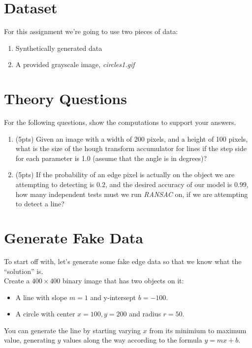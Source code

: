 \documentclass[12pt]{article}
\begin{document}
\newpage
\section*{Dataset}
For this assignment we're going to use two pieces of data:
\begin{enumerate}
\item Synthetically generated data
\item A provided grayscale image,  \emph{circles1.gif}
\end{enumerate}

\newpage
\section{Theory Questions}
\noindent
For the following questions, show the computations to support your answers.
\begin{enumerate}
\item (5pts) Given an image with a width of 200 pixels, and a height of 100 pixels, what is the size of the hough transform accumulator for lines if the step side for each parameter is 1.0 (assume that the angle is in degrees)?
\item (5pts) If the probability of an edge pixel is actually on the object we are attempting to detecting is $0.2$, and the desired accuracy of our model is $0.99$, how many independent tests must we run \emph{RANSAC} on, if we are attempting to detect a line?
\end{enumerate}


\newpage
\section{Generate Fake Data}
To start off with, let's generate some fake edge data so that we know what the ``solution'' is.\\

\noindent
Create a $400\times400$ binary image that has two objects on it:
\begin{itemize}
\item A line with slope $m=1$ and y-intersept $b=-100$.
\item A circle with center $x=100, y=200$ and radius $r=50$.
\end{itemize}

\noindent
You can generate the line by starting varying $x$ from its minimium to maximum value, generating $y$ values along the way according to the formula $y=mx+b$.\\
\end{document}
